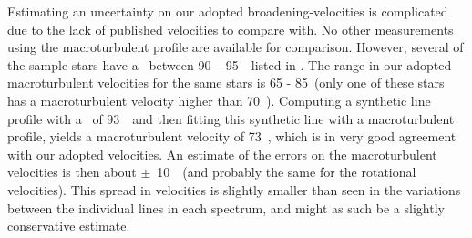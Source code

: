 Estimating an uncertainty on our adopted broadening-velocities is
complicated due to the lack of published velocities to compare
with. No other measurements using the macroturbulent profile are
available for comparison. However, several of the sample stars have a
\vsini\ between 90 -- 95~\kms\ listed in . The range in
our adopted macroturbulent velocities for the same stars is 65 -
85~\kms (only one of these stars has a macroturbulent velocity higher
than 70~\kms). Computing a synthetic line profile with a \vsini\ of
93~\kms\ and then fitting this synthetic line with a macroturbulent
profile, yields a macroturbulent velocity of 73~\kms, which is in very
good agreement with our adopted velocities. An estimate of the errors
on the macroturbulent velocities is then about $\pm$~10~\kms\ (and
probably the same for the rotational velocities). This spread in
velocities is slightly smaller than seen in the variations between the
individual lines in each spectrum, and might as such be a slightly
conservative estimate.

